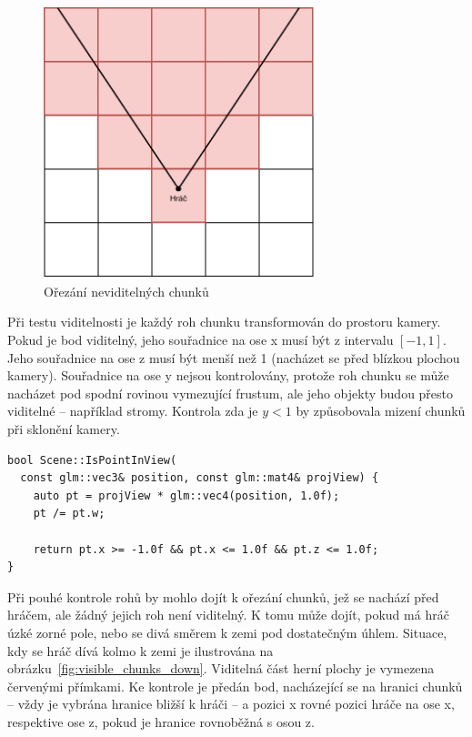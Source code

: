 \documentclass[thesis=M,czech]{FITthesis}[2019/12/23]
\begin{document}
\begin{figure}\centering
	\includegraphics[width=0.7\textwidth]{images/visible_chunks}
	\caption[Ořezání neviditelných chunků]{Ořezání neviditelných chunků}\label{fig:visible_chunks}
\end{figure}

Při testu viditelnosti je každý roh chunku transformován do prostoru kamery. Pokud je bod viditelný, jeho souřadnice na ose x musí být z intervalu $[-1, 1]$. Jeho souřadnice na ose z musí být menší než 1 (nacházet se před blízkou plochou kamery). Souřadnice na ose y nejsou kontrolovány, protože roh chunku se může nacházet pod spodní rovinou vymezující frustum, ale jeho objekty budou přesto viditelné -- například stromy. Kontrola zda je $y < 1$ by způsobovala mizení chunků při sklonění kamery.

\newpage

\begin{verbatim}
bool Scene::IsPointInView(
  const glm::vec3& position, const glm::mat4& projView) {
    auto pt = projView * glm::vec4(position, 1.0f);
    pt /= pt.w;

    return pt.x >= -1.0f && pt.x <= 1.0f && pt.z <= 1.0f;
}
\end{verbatim}

Při pouhé kontrole rohů by mohlo dojít k ořezání chunků, jež se nachází před hráčem, ale žádný jejich roh není viditelný. K tomu může dojít, pokud má hráč úzké zorné pole, nebo se divá směrem k zemi pod dostatečným úhlem. Situace, kdy se hráč dívá kolmo k zemi je ilustrována na obrázku~\ref{fig:visible_chunks_down}. Viditelná část herní plochy je vymezena červenými přímkami. Ke kontrole je předán bod, nacházející se na hranici chunků -- vždy je vybrána hranice bližší k hráči -- a pozici x rovné pozici hráče na ose x, respektive ose z, pokud je hranice rovnoběžná s osou z.
\end{document}
